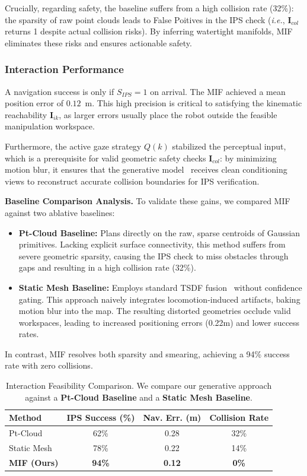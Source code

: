 \documentclass[conference]{IEEEtran}
\begin{document}
Crucially, regarding safety, the baseline suffers from a high collision rate (32\%): the sparsity of raw point clouds leads to False Poitives in the IPS check (\emph{i.e.}, $\mathbf{I}_{col}$ returns 1 despite actual collision risks). By inferring watertight manifolds, MIF eliminates these risks and ensures actionable safety.


\subsubsection{Interaction Performance}
A navigation success is only if $S_{IPS}=1$ on arrival. The MIF achieved a mean position error of $\mathbf{0.12}$~m. This high precision is critical to satisfying the kinematic reachability $\mathbf{I}_{ik}$, as larger errors usually place the robot outside the feasible manipulation workspace.

Furthermore, the active gaze strategy $Q(k)$ stabilized the perceptual input, which is a prerequisite for valid geometric safety checks $\mathbf{I}_{col}$: by minimizing motion blur, it ensures that the generative model~\cite{lipman2022flow, chen2025sam} receives clean conditioning views to reconstruct accurate collision boundaries for IPS verification.

\vspace{1mm}
\noindent \textbf{Baseline Comparison Analysis.}
To validate these gains, we compared MIF against two ablative baselines:
\begin{itemize}
    \item \textbf{Pt-Cloud Baseline:} Plans directly on the raw, sparse centroids of Gaussian primitives. Lacking explicit surface connectivity, this method suffers from severe geometric sparsity, causing the IPS check to miss obstacles through gaps and resulting in a high collision rate (32\%).
    \item \textbf{Static Mesh Baseline:} Employs standard TSDF fusion~\cite{oleynikova2016signed} without confidence gating. This approach naively integrates locomotion-induced artifacts, baking motion blur into the map. The resulting distorted geometries occlude valid workspaces, leading to increased positioning errors (0.22m) and lower success rates.
\end{itemize}
In contrast, MIF resolves both sparsity and smearing, achieving a 94\% success rate with zero collisions.

\begin{table}[h]
\centering
\small
\caption{Interaction Feasibility Comparison. We compare our generative approach against a \textbf{Pt-Cloud Baseline} and a \textbf{Static Mesh Baseline}.}
\label{tab:nav_results}
\begin{tabularx}{\columnwidth}{@{} l c c c @{}} 
\toprule
\textbf{Method} & \textbf{IPS Success (\%)} & \textbf{Nav. Err. (m)} & \textbf{Collision Rate} \\ \midrule
Pt-Cloud & 62\% & 0.28 & 32\% \\
Static Mesh & 78\% & 0.22 & 14\% \\
\textbf{MIF (Ours)} & \textbf{94\%} & \textbf{0.12} & \textbf{0\%} \\ \bottomrule
\end{tabularx}
\end{table}
\end{document}
